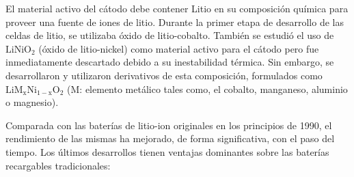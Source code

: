 \documentclass[10pt,a4paper]{article}
\begin{document}
\noindent El material activo del cátodo debe contener Litio en su composición
química para proveer una fuente de iones de litio. Durante la primer etapa de
desarrollo de las celdas de litio, se utilizaba \'oxido de litio-cobalto.
También se estudió el uso de $\mathrm{LiNiO_2}$ (\'oxido de litio-nickel) como 
material activo para el cátodo pero fue inmediatamente descartado debido a su 
inestabilidad térmica. Sin embargo, se desarrollaron y utilizaron derivativos de 
esta composición, formulados como $\mathrm{LiM_xNi_{1-x}O_2}$  
(M: elemento metálico tales como, el cobalto, manganeso, aluminio o magnesio).

\newpage

\noindent Comparada con las baterías de litio-ion originales en los principios 
de 1990, el rendimiento de las mismas ha mejorado, de forma significativa, con 
el paso del tiempo. Los últimos desarrollos tienen ventajas dominantes sobre 
las baterías recargables tradicionales:
\end{document}

